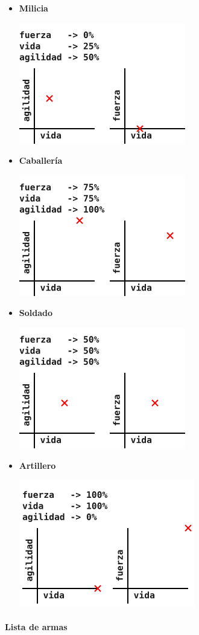 \begin{itemize}
\item \textbf{Milicia}
  \begin{center}
    \includegraphics[width=.3\textwidth]{assets/lvl-design/milicia.png}
  \end{center}

\item \textbf{Caballería}
  \begin{center}
    \includegraphics[width=.3\textwidth]{assets/lvl-design/caballeria.png}
  \end{center}

\item \textbf{Soldado}
  \begin{center}
    \includegraphics[width=.3\textwidth]{assets/lvl-design/soldado.png}
  \end{center}

\item \textbf{Artillero}
  \begin{center}
    \includegraphics[width=.3\textwidth]{assets/lvl-design/artillero.png}
  \end{center}
\end{itemize}

\paragraph{Lista de armas}

